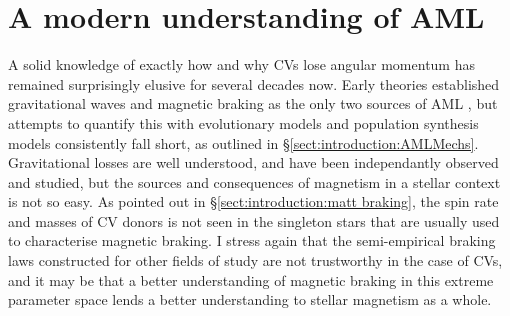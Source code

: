 \section{A modern understanding of AML}
A solid knowledge of exactly how and why CVs lose angular momentum has remained surprisingly elusive for several decades now. Early theories established gravitational waves and magnetic braking as the only two sources of AML , but attempts to quantify this with evolutionary models  and population synthesis models  consistently fall short, as outlined in \S\ref{sect:introduction:AMLMechs}. Gravitational losses are well understood, and have been independantly observed and studied, but the sources and consequences of magnetism in a stellar context is not so easy. 
As pointed out in \S\ref{sect:introduction:matt braking}, the spin rate and masses of CV donors is not seen in the singleton stars that are usually used to characterise magnetic braking. I stress again that the semi-empirical braking laws constructed for other fields of study are not trustworthy in the case of CVs, and it may be that a better understanding of magnetic braking in this extreme parameter space lends a better understanding to stellar magnetism as a whole. 


